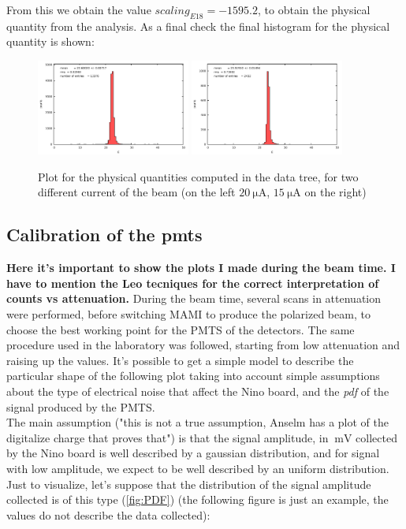 {From this we obtain the value $scaling_{E18} = -1595.2$, to obtain the physical quantity from the analysis. As a final check the final histogram for the physical quantity is shown:

\begin{figure}[hbtp]
\centering
\includegraphics[width = 0.45\textwidth]{Analysis/ENMOCheck20.pdf}
\includegraphics[width = 0.45\textwidth]{Analysis/ENMOCheck15.pdf} 
\caption{Plot for the physical quantities computed in the data tree, for two different current of the beam (on the left $\SI{20}{\micro \ampere}$, $\SI{15}{\micro \ampere}$ on the right)}
\end{figure}



\subsection{Calibration of the pmts}

{\bfseries Here it's important to show the plots I made during the beam time. I have to mention the Leo tecniques for the correct interpretation of counts vs attenuation.}
During the beam time, several scans in attenuation were performed, before switching MAMI to produce the polarized beam, to choose the best working point for the PMTS of the detectors. The same procedure used in the laboratory was followed, starting from low attenuation and raising up the values. It's possible to get a simple model to describe the particular shape of the following plot taking into account simple assumptions about the type of electrical noise that affect the Nino board, and the \textit{pdf} of the signal produced by the PMTS.\\

The main assumption ("this is not a true assumption, Anselm has a plot of the digitalize charge that proves that") is that the signal amplitude, in $\SI{}{\milli \volt}$ collected by the Nino board is well described by a gaussian distribution, and for signal with low amplitude, we expect to be well described by an uniform distribution. Just to visualize, let's suppose that the distribution of the signal amplitude collected is of this type (\ref{fig:PDF}) (the following figure is just an example, the values ​​do not describe the data collected):

}
